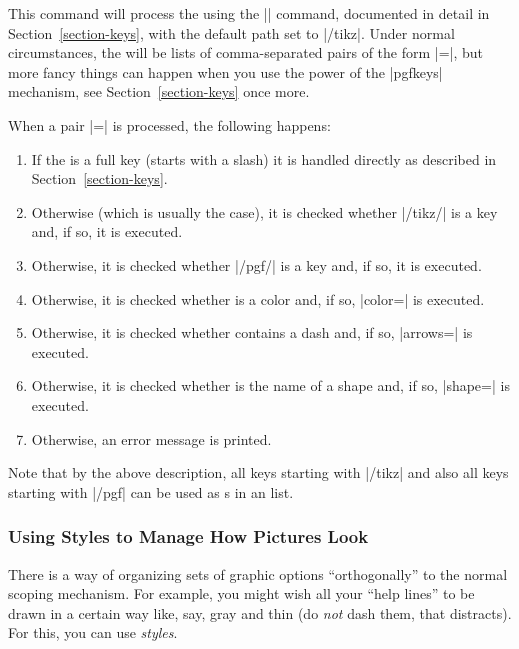 \begin{command}{\tikzset{}}
  This command will process the  using the |\pgfkeys|
  command, documented in detail in Section~\ref{section-keys}, with
  the default path set to |/tikz|. Under normal circumstances, the
   will be lists of comma-separated pairs of the form
  |=|, but more fancy things can happen when you
  use the power of the |pgfkeys| mechanism, see
  Section~\ref{section-keys} once more.

  When a pair |=| is processed, the following
  happens:
  \begin{enumerate}
  \item If the  is a full key (starts with a slash) it is
    handled directly as described in Section~\ref{section-keys}.
  \item Otherwise (which is usually the case), it is checked whether
    |/tikz/| is a key and, if so, it is executed.
  \item Otherwise, it is checked whether |/pgf/| is a key
    and, if so, it is executed.
  \item Otherwise, it is checked whether  is a color and, if
    so, |color=| is executed.
  \item Otherwise, it is checked whether  contains a dash
    and, if so, |arrows=| is executed.
  \item Otherwise, it is checked whether  is the name of a
    shape and, if so, |shape=| is executed.
  \item Otherwise, an error message is printed.
  \end{enumerate}

  Note that by the above description, all keys starting with |/tikz|
  and also all keys starting with |/pgf| can be used as s in
  an  list.
\end{command}


\subsubsection{Using Styles to Manage How Pictures Look}

There is a way of organizing sets of graphic options ``orthogonally''
to the normal scoping mechanism. For example, you might wish all your
``help lines'' to be drawn in a certain way like, say, gray and thin
(do \emph{not} dash them, that distracts). For this, you can use
\emph{styles}.

